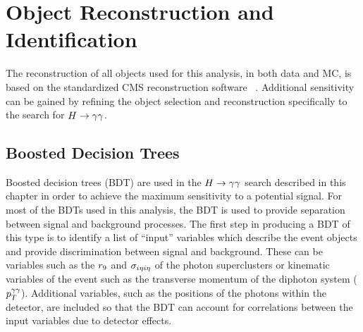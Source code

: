 \section{Object Reconstruction and Identification}
\label{sec:objectrecoandid}

The reconstruction of all objects used for this analysis, in both data and MC,
is based on the standardized CMS reconstruction software \texttt{\cmssw}~\citep{cmssw}. 
Additional sensitivity can be gained by refining the object selection and reconstruction specifically
to the search for $H\rightarrow\gamma\gamma$.

\subsection{Boosted Decision Trees}
\label{sec:bdts}
Boosted decision trees (BDT) are used in the $H\rightarrow\gamma\gamma$ search described in this
chapter in order to achieve the maximum sensitivity to a potential signal.
For most of the BDTs used in this analysis, the BDT is used to provide separation between signal and background processes. 
The first step in producing a BDT of this type is to identify a list of ``input'' 
variables which describe the event objects and provide discrimination 
between signal and background.  
These can be variables such as the $r_{9}$ and $\sigma_{i\eta i\eta}$ 
of the photon superclusters or kinematic variables of the event such as
the transverse momentum of the diphoton system ($p_{T}^{\gamma\gamma}$). 
Additional variables, such as the positions of the photons within the detector, 
are included so that the BDT can account for correlations between the 
input variables due to detector effects.

